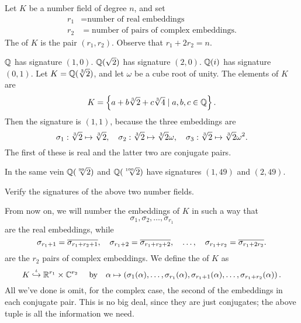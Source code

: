\begin{definition}
	Let $K$ be a number field of degree $n$, and set
	\begin{align*}
		r_1 &= \text{number of real embeddings} \\
		r_2 &= \text{number of pairs of complex embeddings}.
	\end{align*}
	The  of $K$ is the pair $(r_1, r_2)$.
	Observe that $r_1 + 2r_2 = n$.
\end{definition}
\begin{example}
	\listhack
	\begin{enumerate}[(a)]
		\ii $\mathbb Q$ has signature $(1,0)$.
		\ii $\mathbb Q(\sqrt 2)$ has signature $(2,0)$.
		\ii $\mathbb Q(i)$ has signature $(0,1)$.
		\ii Let $K = \mathbb Q(\sqrt[3]{2})$, and let $\omega$ be a cube root of unity.
		The elements of $K$ are
		\[ K = \left\{ a + b\sqrt[3]{2} + c\sqrt[3]{4} \mid a,b,c \in \mathbb Q  \right\}. \]
		Then the signature is $(1,1)$, because the three embeddings are
		\[ \sigma_1 : \sqrt[3]{2} \mapsto \sqrt[3]{2},
			\quad
			\sigma_2 : \sqrt[3]{2} \mapsto \sqrt[3]{2} \omega,
			\quad
			\sigma_3 : \sqrt[3]{2} \mapsto \sqrt[3]{2} \omega^2. \]
		The first of these is real and the latter two are conjugate pairs.
	\end{enumerate}
\end{example}
\begin{example}
	In the same vein $\mathbb Q(\sqrt[99]{2})$ and $\mathbb Q(\sqrt[100]{2})$
	have signatures $(1,49)$ and $(2,49)$.
\end{example}
\begin{ques}
	Verify the signatures of the above two number fields.
\end{ques}

From now on, we will number the embeddings of $K$ in such a way that
\[ \sigma_1, \sigma_2, \dots, \sigma_{r_1}  \]are the real embeddings,
while 
\[
	\sigma_{r_1+1} = \overline{\sigma_{r_1+r_2+1}}, \quad
	\sigma_{r_1+2} = \overline{\sigma_{r_1+r_2+2}}, \quad
	\dots, \quad
	\sigma_{r_1+r_2} = \overline{\sigma_{r_1+2r_2}}.
\]
are the $r_2$ pairs of complex embeddings.
We define the  of $K$ as
\[
	K \overset\iota{\hookrightarrow} \mathbb R^{r_1} \times \mathbb C^{r_2} \
	\quad\text{by}\quad
	\alpha \mapsto  \left( \sigma_1(\alpha), \dots, \sigma_{r_1}(\alpha),
	\sigma_{r_1+1}(\alpha), \dots, \sigma_{r_1+r_2}(\alpha) \right). 
\]
All we've done is omit, for the complex case, the second of the embeddings in each conjugate pair.
This is no big deal, since they are just conjugates;
the above tuple is all the information we need.

